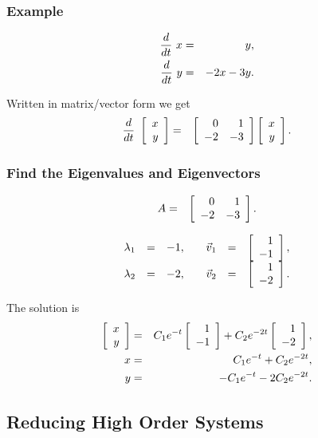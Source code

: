 \begin{frame}
  \frametitle{Example}
  
  \begin{eqnarray*}
    \deriv{~}{t} x & = &  y, \\
    \deriv{~}{t} y & = & -2 x -3y.
  \end{eqnarray*}

  {
    Written in matrix/vector form we get
    \begin{eqnarray*}
      \deriv{~}{t} \vecTwo{x}{y} & = & 
      \arrayTwo{0}{1}{-2}{-3} \vecTwo{x}{y}.
    \end{eqnarray*}
  }
  
\end{frame}

\begin{frame}
  \frametitle{Find the Eigenvalues and Eigenvectors}

  \begin{eqnarray*}
    A & = & \arrayTwo{0}{1}{-2}{-3}.
  \end{eqnarray*}

  {
    \begin{eqnarray*}
      \begin{array}{rcl@{\hspace{2em}}rcl}
          \lambda_1 & = & -1, & \vec{v}_1 & = & \vecTwo{1}{-1}, \\
          \lambda_2 & = & -2, & \vec{v}_2 & = & \vecTwo{1}{-2}.
        \end{array}
    \end{eqnarray*}
  }

  {
    The solution is
    \begin{eqnarray*}
       \vecTwo{x}{y} & = & C_1 e^{-t} \vecTwo{1}{-1}  + C_2 e^{-2t} \vecTwo{1}{-2}, \\
      x & = & C_1 e^{-t} + C_2 e^{-2t}, \\
      y & = & -C_1 e^{-t} - 2 C_2 e^{-2t}.
    \end{eqnarray*}
  }

\end{frame}


\subsection{Reducing High Order Systems}

